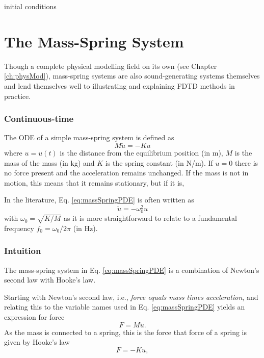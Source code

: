 initial conditions

\section{%
The Mass-Spring System}
Though a complete physical modelling field on its own (see Chapter \ref{ch:physMod}), mass-spring systems are also sound-generating systems themselves and lend themselves well to illustrating and explaining FDTD methods in practice. 

\subsubsection{Continuous-time}
The ODE of a simple mass-spring system is defined as
\begin{equation}\label{eq:massSpringPDE}
    M\ddot u = -Ku
\end{equation}
where $u = u(t)$ is the distance from the equilibrium position (in m), $M$ is the mass of the mass (in kg) and $K$ is the spring constant (in N/m). If $u = 0$ there is no force present and the acceleration remains unchanged. If the mass is not in motion, this means that it remains stationary, but if it is, 


In the literature, Eq. \eqref{eq:massSpringPDE} is often written as
\begin{equation}
    \ddot u = -\omega_0^2u
\end{equation}
with $\omega_0 = \sqrt{K/M}$ as it is more straightforward to relate to a fundamental frequency $f_0 = \omega_0 / 2 \pi$ (in Hz).



\subsubsection{Intuition}
The mass-spring system in Eq. \eqref{eq:massSpringPDE} is a combination of Newton's second law with Hooke's law. 

Starting with Newton's second law, i.e., \textit{force equals mass times acceleration}, and relating this to the variable names used in Eq. 
\eqref{eq:massSpringPDE} yields an expression for force
\begin{equation}\label{eq:newton2nd}
    F = M\ddot u.
\end{equation}
As the mass is connected to a spring, this is the force that  force of a spring is given by Hooke's law
\begin{equation}
    F = -Ku,
\end{equation} 

